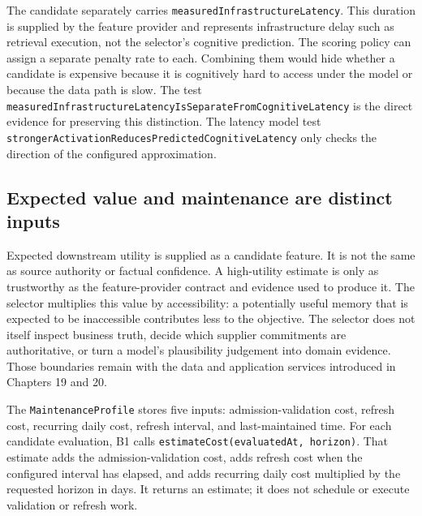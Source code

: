 The candidate separately carries \texttt{measured\allowbreak{}Infrastructure\allowbreak{}Latency}. This duration is supplied by the feature provider and represents infrastructure delay such as retrieval execution, not the selector's cognitive prediction. The scoring policy can assign a separate penalty rate to each. Combining them would hide whether a candidate is expensive because it is cognitively hard to access under the model or because the data path is slow. The test \texttt{measured\allowbreak{}Infrastructure\allowbreak{}Latency\allowbreak{}Is\allowbreak{}Separate\allowbreak{}From\allowbreak{}Cognitive\allowbreak{}Latency} is the direct evidence for preserving this distinction. The latency model test \texttt{stronger\allowbreak{}Activation\allowbreak{}Reduces\allowbreak{}Predicted\allowbreak{}Cognitive\allowbreak{}Latency} only checks the direction of the configured approximation.

\subsection{Expected value and maintenance are distinct inputs}
\label{subsec:ch21-b1-value-maintenance}

Expected downstream utility is supplied as a candidate feature. It is not the same as source authority or factual confidence. A high-utility estimate is only as trustworthy as the feature-provider contract and evidence used to produce it. The selector multiplies this value by accessibility: a potentially useful memory that is expected to be inaccessible contributes less to the objective. The selector does not itself inspect business truth, decide which supplier commitments are authoritative, or turn a model's plausibility judgement into domain evidence. Those boundaries remain with the data and application services introduced in Chapters 19 and 20.

The \texttt{MaintenanceProfile} stores five inputs: admission-validation cost, refresh cost, recurring daily cost, refresh interval, and last-maintained time. For each candidate evaluation, B1 calls \texttt{estimateCost(evaluatedAt, horizon)}. That estimate adds the admission-validation cost, adds refresh cost when the configured interval has elapsed, and adds recurring daily cost multiplied by the requested horizon in days. It returns an estimate; it does not schedule or execute validation or refresh work.

